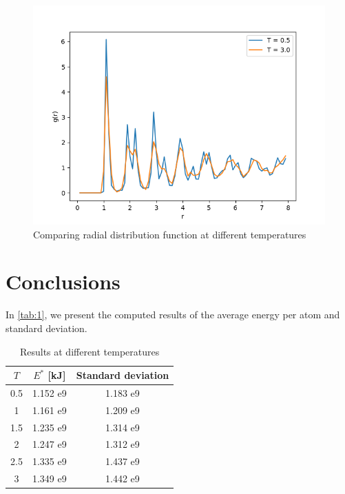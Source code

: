\documentclass{article}
\begin{document}
\begin{figure}[H]
    \centering
    \includegraphics[width=.6\linewidth]{images/RadialComparison.png}
    \caption{Comparing radial distribution function at different temperatures}
    \label{fig:radial}
\end{figure}
\section{Conclusions}
In \autoref{tab:1}, we present the computed results of the average energy per atom and standard deviation.
\begin{table}[H]
    \centering
    \begin{tabular}{|c|c|c|}
        \hline
        $T$& $E^*$ [kJ] & Standard deviation \\\hline\hline
        0.5 & 1.152 e9 & 1.183 e9 \\\hline
        1 & 1.161 e9 & 1.209 e9 \\\hline
        1.5 & 1.235 e9 & 1.314 e9 \\\hline
        2 & 1.247 e9 & 1.312 e9 \\\hline
        2.5 & 1.335 e9 & 1.437 e9 \\\hline
        3 & 1.349 e9 & 1.442 e9 \\\hline
    \end{tabular}
    \caption{Results at different temperatures}
    \label{tab:1}
\end{table}
\end{document}
